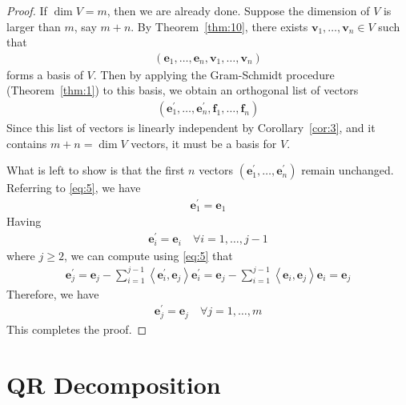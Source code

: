 \documentclass[thmcnt=section, color=blue, 12pt]{my-elegantbook}
\begin{document}
\begin{proof}
    If $\dim V = m$, then we are already done. Suppose the dimension of $V$ is larger than $m$, say $m + n$. By Theorem~\ref{thm:10}, there exists $\mathbf{v}_1, \ldots, \mathbf{v}_n \in V$ such that 
    \begin{align*}
        (\mathbf{e}_1, \ldots, \mathbf{e}_n, \mathbf{v}_1, \ldots, \mathbf{v}_n)
    \end{align*}
    forms a basis of $V$. Then by applying the Gram-Schmidt procedure (Theorem~\ref{thm:1}) to this basis, we obtain an orthogonal list of vectors
    \begin{align*}
        (\mathbf{e}_1^\prime, \ldots, \mathbf{e}_n^\prime, \mathbf{f}_1, \ldots, \mathbf{f}_n)
    \end{align*}
    Since this list of vectors is linearly independent by Corollary~\ref{cor:3}, and it contains $m+n = \dim V$ vectors, it must be a basis for $V$.

    What is left to show is that the first $n$ vectors $(\mathbf{e}_1^\prime, \ldots, \mathbf{e}_n^\prime)$ remain unchanged. Referring to \eqref{eq:5}, we have
    \begin{align*}
        \mathbf{e}_1^\prime = \mathbf{e}_1
    \end{align*}
    Having 
    \begin{align*}
        \mathbf{e}_i^\prime = \mathbf{e}_i
        \quad \forall i=1, \ldots,j-1
    \end{align*}
    where $j \geq 2$, we can compute using \eqref{eq:5} that 
    \begin{align*}
        \mathbf{e}_j^\prime 
        = \mathbf{e}_j - \sum_{i=1}^{j-1} \left\langle 
            \mathbf{e}_i^\prime,
            \mathbf{e}_j
        \right\rangle \mathbf{e}_i^\prime
        = \mathbf{e}_j - \sum_{i=1}^{j-1}
            \left\langle 
                \mathbf{e}_i,
                \mathbf{e}_j
            \right\rangle \mathbf{e}_i
        = \mathbf{e}_j
    \end{align*}
    Therefore, we have 
    \begin{align*}
        \mathbf{e}_j^\prime = \mathbf{e}_j
        \quad \forall j = 1, \ldots, m
    \end{align*}
    This completes the proof.
\end{proof}


\section{QR Decomposition}
\end{document}

